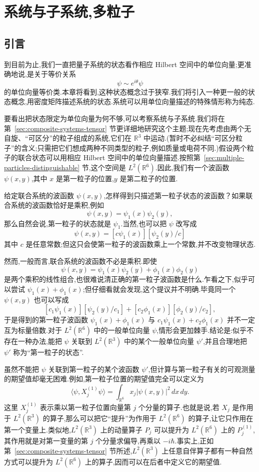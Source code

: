 \chapter{系统与子系统,多粒子}
\label{chap:systems-subsystems}

\section{引言}
\label{sec:systems-subsystems-intro}

到目前为止,我们一直把量子系统的状态看作相应 Hilbert 空间中的单位向量;更准确地说,是关于等价关系
\[
 \psi\sim e^{i\theta}\psi
\]
的单位向量等价类.本章将看到,这种状态概念过于狭窄.我们将引入一种更一般的状态概念,用密度矩阵描述系统的状态.系统可以用单位向量描述的特殊情形称为纯态.

要看出把状态限定为单位向量为何不够,可以考察系统与子系统.我们将在第~\ref{sec:composite-systems-tensor} 节更详细地研究这个主题;现在先考虑由两个无自旋、“可区分”的粒子组成的系统,它们在 $\mathbb R^3$ 中运动.(暂时不必纠结“可区分粒子”的含义;只需把它们想成两种不同类型的粒子,例如质量或电荷不同.)假设两个粒子的联合状态可以用相应 Hilbert 空间中的单位向量描述.按照第~\ref{sec:multiple-particles-distinguishable} 节,这个空间是 $L^2(\mathbb R^6)$.因此,我们有一个波函数 $\psi(x,y)$,其中 $x$ 是第一粒子的位置,$y$ 是第二粒子的位置.

给定联合系统的波函数 $\psi(x,y)$,怎样得到只描述第一粒子状态的波函数？如果联合系统的波函数恰好是乘积,例如
\[
 \psi(x,y)=\psi_1(x)\psi_2(y),
\]
那么自然会说,第一粒子的状态就是 $\psi_1$.当然,也可以把 $\psi$ 改写成
\[
 \psi(x,y)=[c\psi_1(x)][\psi_2(y)/c]
\]
其中 $c$ 是任意常数;但这只会使第一粒子的波函数乘上一个常数,并不改变物理状态.

然而,一般而言,联合系统的波函数不必是乘积.即使
\[
 \psi(x,y)=\psi_1(x)\psi_2(y)+\phi_1(x)\phi_2(y)
\]
是两个乘积的线性组合,也很难说清正确的第一粒子波函数是什么.乍看之下,似乎可以尝试 $\psi_1(x)+\phi_1(x)$;但仔细看就会发现,这个提议并不明确.毕竟同一个 $\psi(x,y)$ 也可以写成
\[
 [c_1\psi_1(x)][\psi_2(y)/c_1]+[c_2\phi_1(x)][\phi_2(y)/c_2],
\]
于是得到的第一粒子波函数 $\psi_1(x)+\phi_1(x)$ 与 $c_1\psi_1(x)+c_2\phi_1(x)$ 并不一定互为标量倍数.对于 $L^2(\mathbb R^6)$ 中的一般单位向量 $\psi$,情形会更加棘手.结论是:似乎不存在一种办法,能把 $\psi$ 关联到 $L^2(\mathbb R^3)$ 中的某个一般单位向量 $\psi'$,并且合理地把 $\psi'$ 称为“第一粒子的状态”.

虽然不能把 $\psi$ 关联到第一粒子的某个波函数 $\psi'$,但计算与第一粒子有关的可观测量的期望值却毫无困难.例如,第一粒子位置的期望值完全可以定义为
\[
 \langle\psi,X_j^{(1)}\psi\rangle
 =\int_{\mathbb R^6}x_j|\psi(x,y)|^2\,dx\,dy.
\]
这里 $X_j^{(1)}$ 表示乘以第一粒子位置向量第 $j$ 个分量的算子.也就是说,若 $X_j$ 是作用于 $L^2(\mathbb R^3)$ 的算子,那么可以把它“提升”为作用于 $L^2(\mathbb R^6)$ 的算子,让它只作用在第一个变量上.类似地,$L^2(\mathbb R^3)$ 上的动量算子 $P_j$ 可以提升为 $L^2(\mathbb R^6)$ 上的 $P_j^{(1)}$,其作用就是对第一变量的第 $j$ 个分量求偏导,再乘以 $-i\hbar$.事实上,正如第~\ref{sec:composite-systems-tensor} 节所述,$L^2(\mathbb R^3)$ 上任意自伴算子都有一种自然方式可以提升为 $L^2(\mathbb R^6)$ 上的算子,因而可以在后者中定义它的期望值.

